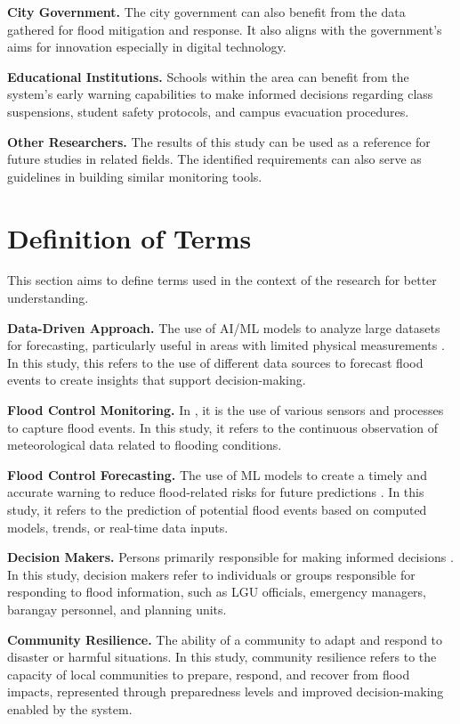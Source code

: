 \documentclass{research}
\begin{document}
\textbf{City Government.} The city government can also benefit from the data gathered for flood mitigation and response. It also aligns with the government's aims for innovation especially in digital technology.

\textbf{Educational Institutions.} Schools within the area can benefit from the system's early warning capabilities to make informed decisions regarding class suspensions, student safety protocols, and campus evacuation procedures.

\textbf{Other Researchers.} The results of this study can be used as a reference for future studies in related fields. The identified requirements can also serve as guidelines in building similar monitoring tools.

\section{Definition of Terms}

This section aims to define terms used in the context of the research for better understanding.

\textbf{Data-Driven Approach.} The use of AI/ML models to analyze large datasets for forecasting, particularly useful in areas with limited physical measurements \cite{okuno2021practical}. In this study, this refers to the use of different data sources to forecast flood events to create insights that support decision-making.

\textbf{Flood Control Monitoring.} In \cite{tao2024review}, it is the use of various sensors and processes to capture flood events. In this study, it refers to the continuous observation of meteorological data related to flooding conditions.

\textbf{Flood Control Forecasting.} The use of ML models to create a timely and accurate warning to reduce flood-related risks for future predictions \cite{nevo2022flood}. In this study, it refers to the prediction of potential flood events based on computed models, trends, or real-time data inputs.

\textbf{Decision Makers.} Persons primarily responsible for making informed decisions \cite{najafi2024high}. In this study, decision makers refer to individuals or groups responsible for responding to flood information, such as LGU officials, emergency managers, barangay personnel, and planning units.

\textbf{Community Resilience.} The ability of a community to adapt and respond to disaster or harmful situations. In this study, community resilience refers to the capacity of local communities to prepare, respond, and recover from flood impacts, represented through preparedness levels and improved decision-making enabled by the system.
\end{document}
